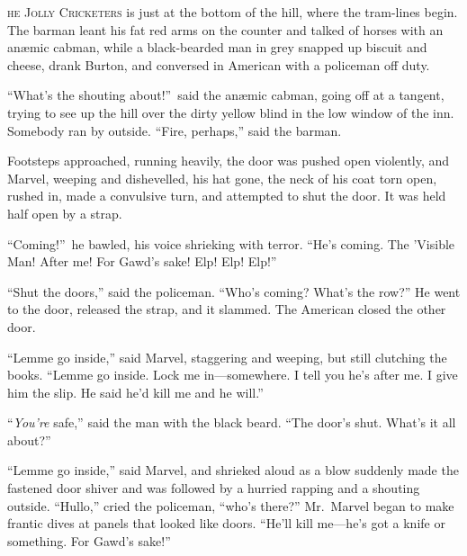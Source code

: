 \label{ch:16}
\begin{ChapterStart}
\vspace*{2\nbs}

\vspace{1.5\nbs}
\vspace{0.75\nbs}
\end{ChapterStart}

\kern-3pt\textsc{he Jolly Cricketers} is just at the bottom of the hill, where the tram-lines begin. The barman leant his fat red arms on the counter and talked of horses with an anæmic cabman, while a black-bearded man in grey snapped up biscuit and cheese, drank Burton, and conversed in American with a policeman off duty.

“What’s the shouting about!”\ said the anæmic cabman, going off at a tangent, trying to see up the hill over the dirty yellow blind in the low window of the inn. Somebody ran by outside. “Fire, perhaps,” said the barman.

Footsteps approached, running heavily, the door was pushed open violently, and Marvel, weeping and dishevelled, his hat gone, the neck of his coat torn open, rushed in, made a convulsive turn, and attempted to shut the door. It was held half open by a strap.

“Coming!”\ he bawled, his voice shrieking with terror. “He’s coming. The ’Visible Man! After me! For Gawd’s sake! Elp! Elp! Elp!”

“Shut the doors,” said the policeman. “Who’s coming? What’s the row?” He went to the door, released the strap, and it slammed. The American closed the other door.

“Lemme go inside,” said Marvel, staggering and weeping, but still clutching the books. “Lemme go inside. Lock me in—somewhere. I tell you he’s after me. I give him the slip. He said he’d kill me and he will.”

“\kern-1pt\emph{You’re} safe,” said the man with the black beard. “The door’s shut. What’s it all about?”

“Lemme go inside,” said Marvel, and shrieked aloud as a blow suddenly made the fastened door shiver and was followed by a hurried rapping and a shouting outside. “Hullo,” cried the policeman, “who’s there?” Mr.\ Marvel began to make frantic dives at panels that looked like doors. “He’ll kill me—he’s got a knife or something. For Gawd’s sake!”

